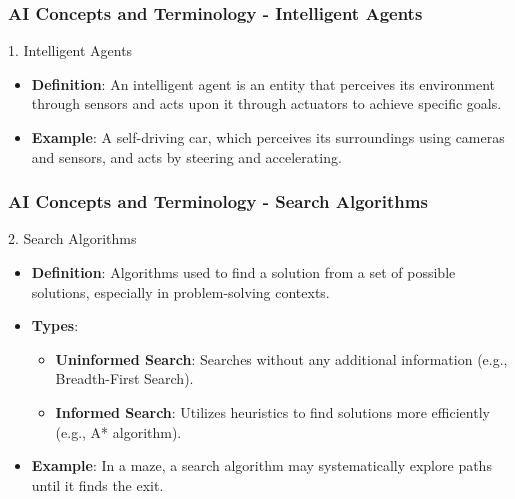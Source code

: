 \documentclass[aspectratio=169]{beamer}
\begin{document}
\begin{frame}[fragile]
    \frametitle{AI Concepts and Terminology - Intelligent Agents}
    \begin{block}{1. Intelligent Agents}
        \begin{itemize}
            \item \textbf{Definition}: An intelligent agent is an entity that perceives its environment through sensors and acts upon it through actuators to achieve specific goals.
            \item \textbf{Example}: A self-driving car, which perceives its surroundings using cameras and sensors, and acts by steering and accelerating.
        \end{itemize}
    \end{block}
\end{frame}

\begin{frame}[fragile]
    \frametitle{AI Concepts and Terminology - Search Algorithms}
    \begin{block}{2. Search Algorithms}
        \begin{itemize}
            \item \textbf{Definition}: Algorithms used to find a solution from a set of possible solutions, especially in problem-solving contexts.
            \item \textbf{Types}:
            \begin{itemize}
                \item \textbf{Uninformed Search}: Searches without any additional information (e.g., Breadth-First Search).
                \item \textbf{Informed Search}: Utilizes heuristics to find solutions more efficiently (e.g., A* algorithm).
            \end{itemize}
            \item \textbf{Example}: In a maze, a search algorithm may systematically explore paths until it finds the exit.
        \end{itemize}
    \end{block}
\end{frame}
\end{document}
